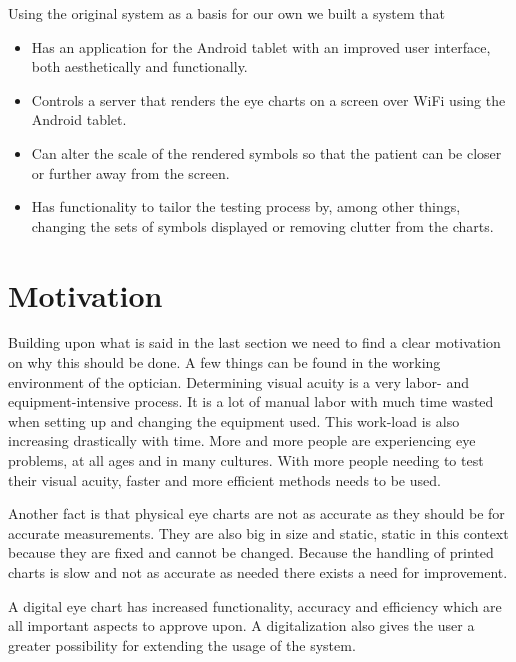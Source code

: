 \documentclass[12pt,a4paper,notitlepage]{report}
\begin{document}
Using the original system as a basis for our own we built a system that

\begin{itemize}
	\item Has an application for the Android tablet with an improved user interface, both aesthetically and functionally.
	\item Controls a server that renders the eye charts on a screen over WiFi using the Android tablet.
	\item Can alter the scale of the rendered symbols so that the patient can be closer or further away from the screen.
	\item Has functionality to tailor the testing process by, among other things, changing the sets of symbols displayed or removing clutter from the charts.
\end{itemize}

\section{Motivation}
Building upon what is said in the last section we need to find a clear motivation on why this should be done. A few things can be found in the working environment of the optician. Determining visual acuity is a very labor- and equipment-intensive process. It is a lot of manual labor with much time wasted when setting up and changing the equipment used. This work-load is also increasing drastically with time. More and more people are experiencing eye problems, at all ages and in many cultures. \cite{vision_loss} With more people needing to test their visual acuity, faster and more efficient methods needs to be used. 

Another fact is that physical eye charts are not as accurate as they should be for accurate measurements. They are also big in size and static, static in this context because they are fixed and cannot be changed. Because the handling of printed charts is slow and not as accurate as needed there exists a need for improvement. 

A digital eye chart has increased functionality, accuracy and efficiency which are all important aspects to approve upon. A digitalization also gives the user a greater possibility for extending the usage of the system.
\end{document}
